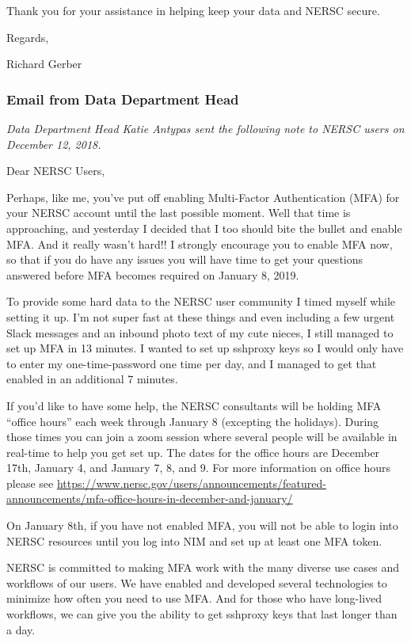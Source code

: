 \documentclass[sigconf,review]{acmart}
\begin{document}
Thank you for your assistance in helping keep your data and NERSC secure.


Regards,

Richard Gerber

\subsubsection{Email from Data Department Head}
{\em Data Department Head Katie Antypas sent the following note to NERSC users
on December 12, 2018.}

Dear NERSC Users,

Perhaps, like me, you've put off enabling Multi-Factor Authentication (MFA) for your NERSC account until the last possible moment.  Well that time is approaching, and yesterday I decided that I too should bite the bullet and enable MFA.  And it really wasn't hard!!  I strongly encourage you to enable MFA now, so that if you do have any issues you will have time to get your questions answered before MFA becomes required on January 8, 2019.  

To provide some hard data to the NERSC user community I timed myself while setting it up.  I’m not super fast at these things and even including a few urgent Slack messages and an inbound photo text of my cute nieces, I still managed to set up MFA in 13 minutes.  I wanted to set up sshproxy keys so I would only have to enter my one-time-password one time per day, and I managed to get that enabled in an additional 7 minutes.  

If you'd like to have some help, the NERSC consultants will be holding MFA ``office hours'' each week through January 8 (excepting the holidays).  During those times you can join a zoom session where several people will be available in real-time to help you get set up. The dates for the office hours are December 17th, January 4, and January 7, 8, and 9. For more information on office hours please see \url{https://www.nersc.gov/users/announcements/featured-announcements/mfa-office-hours-in-december-and-january/}

On January 8th, if you have not enabled MFA, you will not be able to login into NERSC resources until you log into NIM and set up at least one MFA token.  

NERSC is committed to making MFA work with the many diverse use cases and workflows of our users.  We have enabled and developed several technologies to minimize how often you need to use MFA.  And for those who have long-lived workflows, we can give you the ability to get sshproxy keys that last longer than a day.
\end{document}
